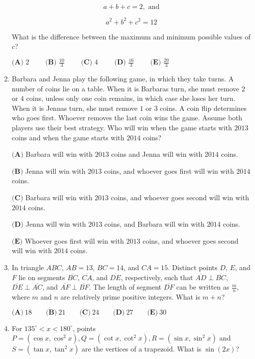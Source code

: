 \documentclass{article}
\begin{document}
\begin{enumerate}[label=\arabic*., itemsep=0.5em]
\begin{equation*}
a+b+c=2, \text{ and}
\end{equation*}


\begin{equation*}
a^2+b^2+c^2=12
\end{equation*}


What is the difference between the maximum and minimum possible values of $c$?

$ \textbf{(A) }2\qquad \textbf{ (B) }\frac{10}{3}\qquad \textbf{ (C) }4 \qquad \textbf{ (D) }\frac{16}{3}\qquad \textbf{ (E) }\frac{20}{3} $\par \vspace{0.5em}\item Barbara and Jenna play the following game, in which they take turns. A number of coins lie on a table. When it is Barbaras turn, she must remove $2$ or $4$ coins, unless only one coin remains, in which case she loses her turn. When it is Jennas turn, she must remove $1$ or $3$ coins. A coin flip determines who goes first. Whoever removes the last coin wins the game. Assume both players use their best strategy. Who will win when the game starts with $2013$ coins and when the game starts with $2014$ coins?

$ \textbf{(A)}$ Barbara will win with $2013$ coins and Jenna will win with $2014$ coins. 

$\textbf{(B)}$ Jenna will win with $2013$ coins, and whoever goes first will win with $2014$ coins. 

$\textbf{(C)}$ Barbara will win with $2013$ coins, and whoever goes second will win with $2014$ coins.

$\textbf{(D)}$ Jenna will win with $2013$ coins, and Barbara will win with $2014$ coins.

$\textbf{(E)}$ Whoever goes first will win with $2013$ coins, and whoever goes second will win with $2014$ coins.\par \vspace{0.5em}\item In triangle $ABC$, $AB=13$, $BC=14$, and $CA=15$. Distinct points $D$, $E$, and $F$ lie on segments $\overline{BC}$, $\overline{CA}$, and $\overline{DE}$, respectively, such that $\overline{AD}\perp\overline{BC}$, $\overline{DE}\perp\overline{AC}$, and $\overline{AF}\perp\overline{BF}$. The length of segment $\overline{DF}$ can be written as $\frac{m}{n}$, where $m$ and $n$ are relatively prime positive integers. What is $m+n$?

$ \textbf{(A)}\ 18\qquad\textbf{(B)}\ 21\qquad\textbf{(C)}\ 24\qquad\textbf{(D)}\ 27\qquad\textbf{(E)}\ 30 $\par \vspace{0.5em}\item For $135^\circ < x < 180^\circ$, points $P=(\cos x, \cos^2 x), Q=(\cot x, \cot^2 x), R=(\sin x, \sin^2 x)$ and $S =(\tan x, \tan^2 x)$ are the vertices of a trapezoid. What is $\sin(2x)$?


\end{enumerate}
\end{document}
